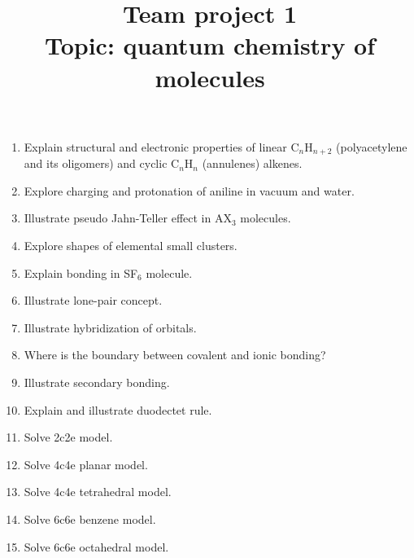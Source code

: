 \documentclass{Project}
\begin{document}
\title{Team project 1 \\ Topic: quantum chemistry of molecules}
\maketitle

\preface{}

\begin{enumerate}
\item Explain structural and electronic properties of linear C$_n$H$_{n+2}$ (polyacetylene and its oligomers) and cyclic C$_n$H$_n$ (annulenes) alkenes.
\item Explore charging and protonation of aniline in vacuum and water.
\item Illustrate pseudo Jahn-Teller effect in AX$_3$ molecules.
\item Explore shapes of elemental small clusters.
\item Explain bonding in SF$_6$ molecule.
\item Illustrate lone-pair concept.
\item Illustrate hybridization of orbitals.
\item Where is the boundary between covalent and ionic bonding?
\item Illustrate secondary bonding.
\item Explain and illustrate duodectet rule.
\item Solve 2c2e model.
\item Solve 4c4e planar model.
\item Solve 4c4e tetrahedral model.
\item Solve 6c6e benzene model.
\item Solve 6c6e octahedral model.
\end{enumerate}

\reminder{}
\end{document}
